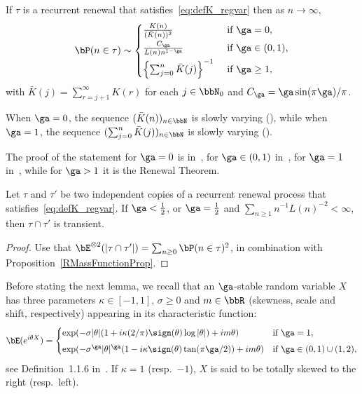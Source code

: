 \begin{prop}\label{RMassFunctionProp}
If $\tau$ is a recurrent renewal that satisfies~\eqref{eq:defK_regvar} then as $n \to \infty$,
\begin{equation}\label{RMassFunction}
\bP(n \in \tau) \sim
\begin{cases}
\frac{K(n)}{(\bar K(n))^2} & \text{ if } \ga = 0,\\[4pt]
\frac{C_\ga}{L(n) n^{1 - \ga}} & \text{ if } \ga \in (0,1),\\[4pt]
\left\{ \sum_{j=0}^n \bar K(j) \right\}^{-1} & \text{ if } \ga \geq 1,
\end{cases}
\end{equation}
with $\bar K(j) = \sum_{r=j+1}^\infty K(r)$ for each $j\in\bbN_0$ and $C_\ga = \ga \sin(\pi \ga)/\pi$.
\end{prop}

When $\ga = 0$, the sequence $(\bar K(n))_{n\in\bbN}$ is slowly varying (\cite[Propos-\linebreak ition~1.5.9$\MK$(b)]{BGT89}), while when $\ga = 1$, the sequence $(\sum_{j=0}^ n \bar K(j))_{n\in\bbN}$ is slowly varying (\cite[Prop\-os\-itions~1.5.10 and~1.5.9$\MK$(a)]{BGT89}).

The proof of the statement for $\ga = 0$ is in~\cite[Theorem~1.1]{Na2012}, for $\ga \in (0,1)$ in~\cite[Theorem~1.1]{GL63}, for $\ga = 1$ in~\cite[Theorem~8.7.5]{BGT89}, while for $\ga > 1$ it is the Renewal Theorem.

\begin{prop}\label{pr:transient.inter}
Let $\tau$ and $\tau'$ be two independent copies of a recurrent renewal process that satisfies~\eqref{eq:defK_regvar}. If $\ga < \frac{1}{2}$, or $\ga = \frac{1}{2}$ and $\sum_{n\geq1} n^{-1} L(n)^{-2} < \infty$, then $\tau \cap \tau'$ is transient.
\end{prop}

\begin{proof}
Use that $\bE^{\otimes 2}(|\tau \cap \tau'|) = \sum_{n\geq0} \bP(n \in \tau)^2$, in combination with Prop\-os\-ition~\ref{RMassFunctionProp}.
\end{proof}

Before stating the next lemma, we recall that an $\ga$-stable random variable $X$ has three parameters $\kappa\in[-1,1]$, $\sigma\ge 0$ and $m\in \bbR$ (skewness, scale and shift, respectively) appearing in its characteristic function:
\begin{equation} \label{eq:stable.cf}
\bE(e^{i\theta X}) =
\begin{cases}
\exp(-\sigma |\theta| (1 + i\kappa (2/\pi) \sign(\theta) \log|\theta|) + im\theta) & \text{if }\ga = 1,\\[4pt]
\exp(-\sigma^\ga |\theta|^\ga (1 - i\kappa \sign(\theta) \tan(\pi \ga /2)) + im\theta) & \text{if } \ga\in(0, 1)\cup(1,2),
\end{cases}
\end{equation} see Definition~1.1.6 in~\cite{ST94}. If $\kappa =1$ (resp.\ $-1$), $X$ is said to be totally skewed to the right (resp.\ left).

